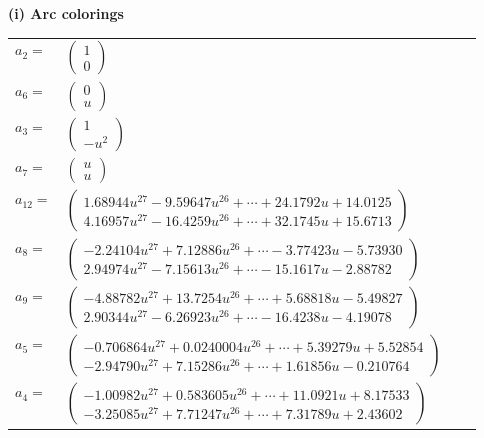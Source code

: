 \documentclass[1p]{elsarticle_modified}
\theoremstyle{definition}
\begin{document}
\flushleft \textbf{(i) Arc colorings}\\
\begin{tabular}{m{7pt} m{180pt} m{7pt} m{180pt} }
\flushright $a_{2}=$&$\begin{pmatrix}1\\0\end{pmatrix}$ \\
\flushright $a_{6}=$&$\begin{pmatrix}0\\u\end{pmatrix}$ \\
\flushright $a_{3}=$&$\begin{pmatrix}1\\- u^2\end{pmatrix}$ \\
\flushright $a_{7}=$&$\begin{pmatrix}u\\u\end{pmatrix}$ \\
\flushright $a_{12}=$&$\begin{pmatrix}1.68944 u^{27}-9.59647 u^{26}+\cdots+24.1792 u+14.0125\\4.16957 u^{27}-16.4259 u^{26}+\cdots+32.1745 u+15.6713\end{pmatrix}$ \\
\flushright $a_{8}=$&$\begin{pmatrix}-2.24104 u^{27}+7.12886 u^{26}+\cdots-3.77423 u-5.73930\\2.94974 u^{27}-7.15613 u^{26}+\cdots-15.1617 u-2.88782\end{pmatrix}$ \\
\flushright $a_{9}=$&$\begin{pmatrix}-4.88782 u^{27}+13.7254 u^{26}+\cdots+5.68818 u-5.49827\\2.90344 u^{27}-6.26923 u^{26}+\cdots-16.4238 u-4.19078\end{pmatrix}$ \\
\flushright $a_{5}=$&$\begin{pmatrix}-0.706864 u^{27}+0.0240004 u^{26}+\cdots+5.39279 u+5.52854\\-2.94790 u^{27}+7.15286 u^{26}+\cdots+1.61856 u-0.210764\end{pmatrix}$ \\
\flushright $a_{4}=$&$\begin{pmatrix}-1.00982 u^{27}+0.583605 u^{26}+\cdots+11.0921 u+8.17533\\-3.25085 u^{27}+7.71247 u^{26}+\cdots+7.31789 u+2.43602\end{pmatrix}$ \\

\end{tabular}
\end{document}
